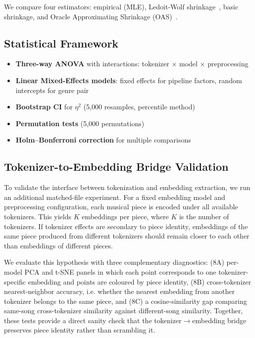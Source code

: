 \documentclass[a4paper]{article}
\begin{document}
We compare four estimators: empirical (MLE), Ledoit-Wolf shrinkage~\citep{ledoit2004well}, basic shrinkage, and Oracle Approximating Shrinkage (OAS)~\citep{chen2010shrinkage}.

\subsection{Statistical Framework}

\begin{itemize}
    \item \textbf{Three-way ANOVA} with interactions: tokenizer $\times$ model $\times$ preprocessing
    \item \textbf{Linear Mixed-Effects models}: fixed effects for pipeline factors, random intercepts for genre pair
    \item \textbf{Bootstrap CI} for $\eta^2$ (5{,}000 resamples, percentile method)
    \item \textbf{Permutation tests} (5{,}000 permutations)
    \item \textbf{Holm--Bonferroni correction} for multiple comparisons
\end{itemize}

\subsection{Tokenizer-to-Embedding Bridge Validation}

To validate the interface between tokenization and embedding extraction, we run an additional matched-file experiment. For a fixed embedding model and preprocessing configuration, each musical piece is encoded under all available tokenizers. This yields $K$ embeddings per piece, where $K$ is the number of tokenizers. If tokenizer effects are secondary to piece identity, embeddings of the same piece produced from different tokenizers should remain closer to each other than embeddings of different pieces.

We evaluate this hypothesis with three complementary diagnostics: (8A) per-model PCA and t-SNE panels in which each point corresponds to one tokenizer-specific embedding and points are coloured by piece identity, (8B) cross-tokenizer nearest-neighbor accuracy, i.e. whether the nearest embedding from another tokenizer belongs to the same piece, and (8C) a cosine-similarity gap comparing same-song cross-tokenizer similarity against different-song similarity. Together, these tests provide a direct sanity check that the tokenizer$\rightarrow$embedding bridge preserves piece identity rather than scrambling it.
\end{document}
